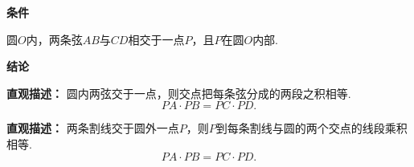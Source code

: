 \begin{statementbox}
	\textbf{\textcolor{CStatement}{条件}}

	\begin{description}[style=nextline, leftmargin=2.8em, labelsep=0.5em, itemsep=0.35em]
		\item[\textbf{\textcolor{CStatement}{条件1（圆内相交）：}}]
		      圆$O$内，两条弦$AB$与$CD$相交于一点$P$，且$P$在圆$O$内部.
	\end{description}

	\textbf{\textcolor{CStatement}{结论}}

	\begin{description}[style=nextline, leftmargin=2.8em, labelsep=0.5em, itemsep=0.45em]
		\item[\textbf{\textcolor{CStatement}{结论一（等积关系）：}}]
		      \textbf{\textcolor{CStatement}{直观描述：}}
		      圆内两弦交于一点，则交点把每条弦分成的两段之积相等.
		      \[
			      PA \cdot PB = PC \cdot PD.
		      \]

		\item[\textbf{\textcolor{CStatement}{常见变形（圆外割线）：}}]
		      \textbf{\textcolor{CStatement}{直观描述：}}
		      两条割线交于圆外一点$P$，则$P$到每条割线与圆的两个交点的线段乘积相等.
		      \[
			      PA \cdot PB = PC \cdot PD.
		      \]
	\end{description}
\end{statementbox}